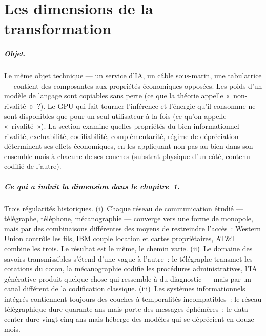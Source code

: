 \section{Les dimensions de la transformation}\label{sec:dimensions}




\subparagraph{Objet.}
Le même objet technique --- un service d'IA, un câble sous-marin, une tabulatrice --- contient des composantes aux propriétés économiques opposées. Les poids d'un modèle de langage sont copiables sans perte (ce que la théorie appelle «~non-rivalité~»~?). Le GPU qui fait tourner l'inférence et l'énergie qu'il consomme ne sont disponibles que pour un seul utilisateur à la fois (ce qu'on appelle «~rivalité~»). La section examine quelles propriétés du bien informationnel --- rivalité, excluabilité, codifiabilité, complémentarité, régime de dépréciation --- déterminent ses effets économiques, en les appliquant non pas au bien dans son ensemble mais à chacune de ses couches (substrat physique d'un côté, contenu codifié de l'autre).

\subparagraph{Ce qui a induit la dimension dans le chapitre~1.}
Trois régularités historiques. (i)~Chaque réseau de communication étudié --- télégraphe, téléphone, mécanographie --- converge vers une forme de monopole, mais par des combinaisons différentes des moyens de restreindre l'accès~: Western Union contrôle les fils, IBM couple location et cartes propriétaires, AT\&T combine les trois. Le résultat est le même, le chemin varie. (ii)~Le domaine des savoirs transmissibles s'étend d'une vague à l'autre~: le télégraphe transmet les cotations du coton, la mécanographie codifie les procédures administratives, l'IA générative produit quelque chose qui ressemble à du diagnostic --- mais par un canal différent de la codification classique. (iii)~Les systèmes informationnels intégrés contiennent toujours des couches à temporalités incompatibles~: le réseau télégraphique dure quarante ans mais porte des messages éphémères~; le data center dure vingt-cinq ans mais héberge des modèles qui se déprécient en douze mois.

